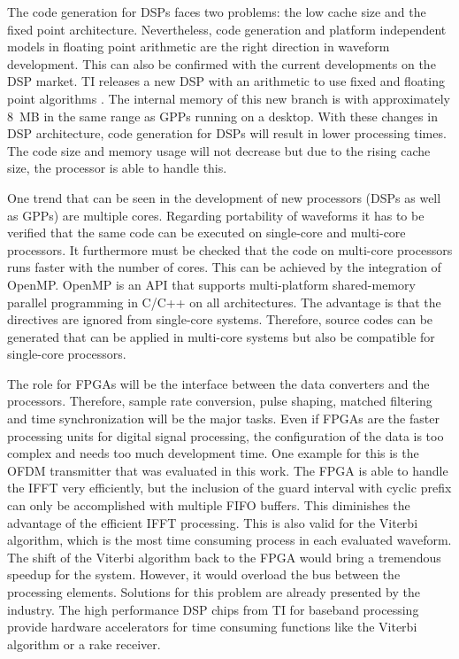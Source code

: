 The code generation for DSPs faces two problems: the low cache size and the fixed point architecture. Nevertheless, code generation and platform independent models in floating point arithmetic are the right direction in waveform development. This can also be confirmed with the current developments on the DSP market. TI releases a new DSP with an arithmetic to use fixed and floating point algorithms \cite{ti_fix_float}. The internal memory of this new branch is with approximately \SI{8}{MB} in the same range as GPPs running on a desktop. With these changes in DSP architecture, code generation for DSPs will result in lower processing times. The code size and memory usage will not decrease but due to the rising cache size, the processor is able to handle this.

One trend that can be seen in the development of new processors (DSPs as well as GPPs) are multiple cores. Regarding portability of waveforms it has to be verified that the same code can be executed on single-core  and multi-core processors. It furthermore must be checked that the code on multi-core processors runs faster with the number of cores. This can be achieved by the integration of OpenMP. OpenMP is an API that supports multi-platform shared-memory parallel programming in C/C++ on all architectures. The advantage is that the directives are ignored from single-core systems. Therefore, source codes can be generated that can be applied in multi-core systems but also be compatible for single-core processors.

The role for FPGAs will be the interface between the data converters and the processors. Therefore, sample rate conversion, pulse shaping, matched filtering and time synchronization will be the major tasks. Even if FPGAs are the faster processing units for digital signal processing, the configuration of the data is too complex and needs too much development time. One example for this is the OFDM transmitter that was evaluated in this work. The FPGA is able to handle the IFFT very efficiently, but the inclusion of the guard interval with cyclic prefix can only be accomplished with multiple FIFO buffers. This diminishes the advantage of the efficient IFFT processing. This is also valid for the Viterbi algorithm, which is the most time consuming process in each evaluated waveform. The shift of the Viterbi algorithm back to the FPGA would bring a tremendous speedup for the system. However, it would overload the bus between the processing elements. Solutions for this problem are already presented by the industry. The high performance DSP chips from TI for baseband processing provide hardware accelerators for time consuming functions like the Viterbi algorithm \cite{ti_vit} or a rake receiver.







